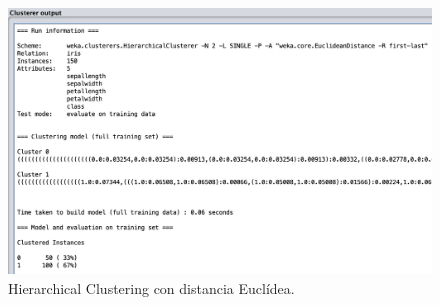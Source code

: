 \documentclass[11pt]{exam}
\begin{document}
\begin{questions}
\begin{figure}[h]
	\centering
	\includegraphics[scale=0.5]{hc_euclidea.png}
	\caption{Hierarchical Clustering con distancia Euclídea.}
	\label{Captura_9}
\end{figure}

\end{questions}
\end{document}
